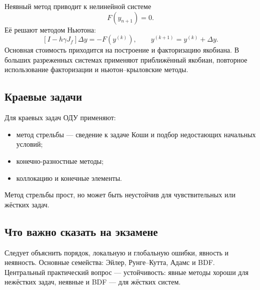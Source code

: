 Неявный метод приводит к нелинейной системе
\[
    F(y_{n+1})=0.
\]
Её решают методом Ньютона:
\[
    \left[I-h\gamma J_f\right]\Delta y=-F(y^{(k)}),
    \qquad
    y^{(k+1)}=y^{(k)}+\Delta y.
\]
Основная стоимость приходится на построение и факторизацию якобиана. В больших
разреженных системах применяют приближённый якобиан, повторное использование
факторизации и ньютон--крыловские методы.

\subsection{Краевые задачи}

Для краевых задач ОДУ применяют:
\begin{itemize}
    \item метод стрельбы --- сведение к задаче Коши и подбор недостающих
          начальных условий;
    \item конечно-разностные методы;
    \item коллокацию и конечные элементы.
\end{itemize}
Метод стрельбы прост, но может быть неустойчив для чувствительных или жёстких
задач.

\subsection{Что важно сказать на экзамене}

Следует объяснить порядок, локальную и глобальную ошибки, явность и неявность.
Основные семейства: Эйлер, Рунге--Кутта, Адамс и BDF. Центральный практический
вопрос --- устойчивость: явные методы хороши для нежёстких задач, неявные и BDF
--- для жёстких систем.

\newpage